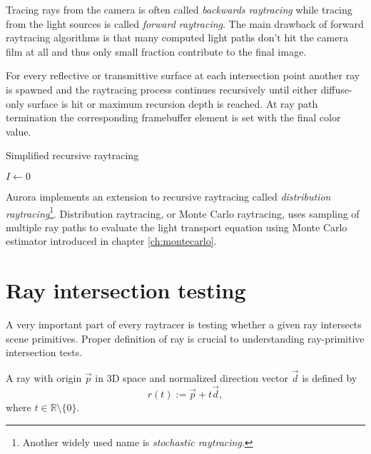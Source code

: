Tracing rays from the camera is often called \emph{backwards raytracing} while tracing from the light sources is called \emph{forward raytracing}. The main drawback of forward raytracing algorithms is that many computed light paths don't hit the camera film at all and thus only small fraction contribute to the final image.

For every reflective or transmittive surface at each intersection point another ray is spawned and the raytracing process continues recursively until either diffuse-only surface is hit or maximum recursion depth is reached. At ray path termination the corresponding framebuffer element is set with the final color value.

\begin{algorithm}
\caption{Simplified recursive raytracing}
$I \leftarrow 0$ \\
\end{algorithm}

Aurora implements an extension to recursive raytracing called \emph{distribution raytracing}\footnote{Another widely used name is \emph{stochastic raytracing}.}. Distribution raytracing, or Monte Carlo raytracing, uses sampling of multiple ray paths to evaluate the light transport equation using Monte Carlo estimator introduced in chapter \ref{ch:montecarlo}.

\section{Ray intersection testing}
A very important part of every raytracer is testing whether a given ray intersects scene primitives. Proper definition of ray is crucial to understanding ray-primitive intersection tests. 
\begin{df}
  A ray with origin $\vec{p}$ in 3D space and normalized direction vector $\vec{d}$ is defined by
  \begin{equation}
    r(t) := \vec{p} + t\vec{d},
  \end{equation}
  where $t \in \mathbb{R} \setminus \{0\}$.
\end{df}

